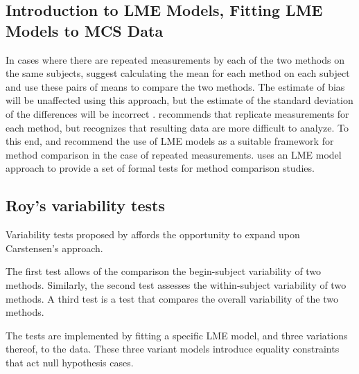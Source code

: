 \documentclass[12pt, a4paper]{report}
\theoremstyle{plain}
\theoremstyle{definition}
\theoremstyle{remark}
\begin{document}
	
	
	
	
	
	
	
	\subsection{Introduction to LME Models, Fitting LME Models to MCS Data}
	
	In cases where there are repeated measurements by each of the two methods on the same subjects, \citet{BA99} suggest calculating
	the mean for each method on each subject and use these pairs of means to compare the two methods. The estimate of bias will be unaffected using this approach, but the estimate of the standard deviation of the differences will be incorrect \citep{BXC2004}. \citet{BXC2004} recommends that replicate measurements for each method, but recognizes that resulting data are more difficult to analyze. To this end, \citet{BXC2004} and \citet{BXC2008} recommend the use of LME models as a suitable framework for method comparison in the case of repeated measurements.
	\citet{ARoy2009} uses an LME model approach to provide a set of formal tests for method comparison studies.
	
	
	
	
	
	\subsection{Roy's variability tests}
	Variability tests proposed by \citet{ARoy2009} affords the opportunity to expand upon Carstensen's approach.
	
	The first test allows of the comparison the begin-subject variability of two methods. Similarly, the second test
	assesses the within-subject variability of two methods. A third test is a test that compares the overall variability of the two methods.
	
	The tests are implemented by fitting a specific LME model, and three variations thereof, to the data. These three variant models introduce equality constraints that act null hypothesis cases.
	
\end{document}

